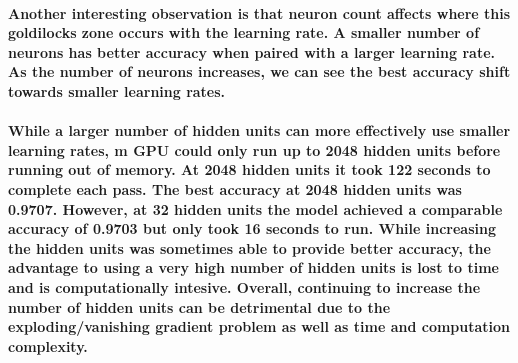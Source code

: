 \documentclass[10pt,a4paper]{report}
\begin{document}
\paragraph{
Another interesting observation is that neuron count affects where this goldilocks zone occurs with the learning rate. A smaller number of neurons has better accuracy when paired with a larger learning rate. As the number of neurons increases, we can see the best accuracy shift towards smaller learning rates.
}

\paragraph{
While a larger number of hidden units can more effectively use smaller learning rates, m GPU could only run up to 2048 hidden units before running out of memory. At 2048 hidden units it took 122 seconds to complete each pass. The best accuracy at 2048 hidden units was 0.9707. However, at 32 hidden units the model achieved a comparable accuracy of 0.9703 but only took 16 seconds to run. While increasing the hidden units was sometimes able to provide better accuracy, the advantage to using a very high number of hidden units is lost to time and is computationally intesive. Overall, continuing to increase the number of hidden units can be detrimental due to the exploding/vanishing gradient problem as well as time and computation complexity.
}
\end{document}
